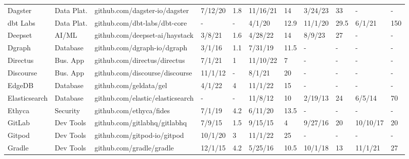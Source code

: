 \begin{landscape}
\begin{table}[htbp]
\begin{tabular}{|p{2.2cm}|p{1.6cm}|p{4cm}|p{1.1cm}|p{0.9cm}|p{1.1cm}|p{0.9cm}|p{1.1cm}|p{0.9cm}|p{1.1cm}|p{0.9cm}|}
Dagster & Data Plat. & github.com/dagster-io/dagster & 7/12/20 & 1.8 & 11/16/21 & 14 & 3/24/23 & 33 & - & - \\
dbt Labs & Data Plat. & github.com/dbt-labs/dbt-core & - & - & 4/1/20 & 12.9 & 11/1/20 & 29.5 & 6/1/21 & 150 \\
Deepset & AI/ML & github.com/deepset-ai/haystack & 3/8/21 & 1.6 & 4/28/22 & 14 & 8/9/23 & 27 & - & - \\
Dgraph & Database & github.com/dgraph-io/dgraph & 3/1/16 & 1.1 & 7/31/19 & 11.5 & - & - & - & - \\
Directus & Bus. App & github.com/directus/directus & 7/1/21 & 1 & 11/10/22 & 7 & - & - & - & - \\
Discourse & Bus. App & github.com/discourse/discourse & 11/1/12 & - & 8/1/21 & 20 & - & - & - & - \\
EdgeDB & Database & github.com/geldata/gel & 4/1/22 & 4 & 11/1/22 & 15 & - & - & - & - \\
Elasticsearch & Database & github.com/elastic/elasticsearch & - & - & 11/8/12 & 10 & 2/19/13 & 24 & 6/5/14 & 70 \\
Ethyca & Security & github.com/ethyca/fides & 7/1/19 & 4.2 & 6/11/20 & 13.5 & - & - & - & - \\
GitLab & Dev Tools & github.com/gitlabhq/gitlabhq & 7/9/15 & 1.5 & 9/15/15 & 4 & 9/27/16 & 20 & 10/10/17 & 20 \\
Gitpod & Dev Tools & github.com/gitpod-io/gitpod & 10/1/20 & 3 & 11/1/22 & 25 & - & - & - & - \\
Gradle & Dev Tools & github.com/gradle/gradle & 12/1/15 & 4.2 & 5/25/16 & 10.5 & 10/1/18 & 13 & 11/1/21 & 27 \\
\hline
\end{tabular}
\end{table}

\clearpage


\end{landscape}
